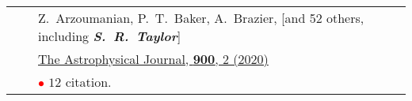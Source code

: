 \documentclass[11pt,letterpaper,sans]{moderncv}
\begin{document}
{\begin{longtable}{rp{0.3cm}p{15.8cm}}
&&Z.~Arzoumanian, P.~T.~Baker, A.~Brazier, [and 52 others, including \textit{\textbf{S.~R.~Taylor}}] \\
&& \href{https://ui.adsabs.harvard.edu/link_gateway/2020ApJ...900..102A/doi:10.3847/1538-4357/ababa1}{{\color{color1} The Astrophysical Journal, \textbf{900}, 2 (2020)}} \\
&& \textcolor{red}{$\bullet$} $12$ citation. \vspace{0.09cm}\\

\end{longtable}}
\end{document}
